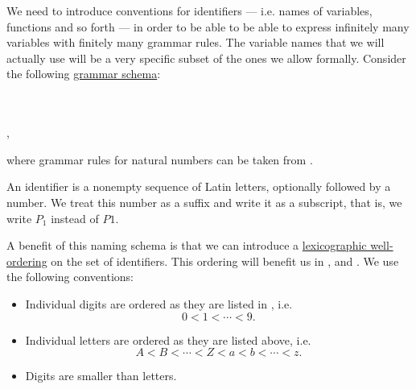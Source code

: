 \begin{remark}\label{rem:grammar_rules_for_variables}
  We need to introduce conventions for identifiers --- i.e. names of variables, functions and so forth --- in order to be able to be able to express infinitely many variables with finitely many grammar rules. The variable names that we will actually use will be a very specific subset of the ones we allow formally. Consider the following \hyperref[rem:backus_normal_form]{grammar schema}:
  \begin{bnf*}
           { \bnfor {} \bnfor \cdots \bnfor {} \bnfor {} \bnfor {} \bnfor \cdots \bnfor {}} \\
             { \bnfor {} \bnfsp {}} \\
       { \bnfor {} \bnfsp {}},
  \end{bnf*}
  where grammar rules for natural numbers can be taken from .

  An identifier is a nonempty sequence of Latin letters, optionally followed by a number. We treat this number as a suffix and write it as a subscript, that is, we write \( P_1 \) instead of \( P1 \).

  A benefit of this naming schema is that we can introduce a \hyperref[thm:def:well_ordered_set/lexicographic]{lexicographic well-ordering} on the set of identifiers. This ordering will benefit us in ,  and . We use the following conventions:
  \begin{itemize}
    \item Individual digits are ordered as they are listed in , i.e.
    \begin{equation*}
      0 < 1 < \cdots < 9.
    \end{equation*}

    \item Individual letters are ordered as they are listed above, i.e.
    \begin{equation*}
      A < B < \cdots < Z < a < b < \cdots < z.
    \end{equation*}

    \item Digits are smaller than letters.


\end{itemize}
\end{remark}
